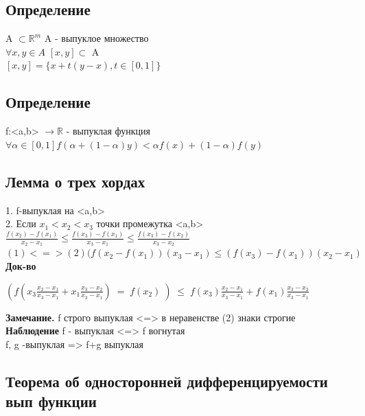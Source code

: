 \documentclass[12pt, a4paper]{article}
\begin{document}
	\subsection{Определение}
	A $\subset \mathbb{R}^m$ A - выпуклое множество \\
	$\forall x, y \in A$  $[x,y] \subset$ A \\
	$[x,y]=\lbrace x+t(y-x), t \in [0,1] \rbrace$ \\
	
	\subsection{Определение}
	f:<a,b> $\rightarrow \mathbb{R}$ - выпуклая функция \\
	$\forall \alpha \in [0,1] f (\alpha + (1-\alpha)y)< \alpha f(x) + (1-\alpha)f(y)$ \\
	
	\subsection{Лемма о трех хордах}
	1. f-выпуклая на <a,b> \\
	2. Если $x_{1} < x_{2} < x_{3}$  точки промежутка <a,b> \\
	$ \frac{f(x_2)-f(x_1)}{x_2-x_1}\leq\frac{\displaystyle f(x_3)-f(x_1)}{\displaystyle x_3-x_1}\leq\frac{\displaystyle f(x_3)-f(x_2)}{\displaystyle x_3-x_2}$ \\
	$(1) <=> (2) (f(x_2-f(x_1))(x_3 -x_1) \leq (f(x_3)-f(x_{1}))(x_{2}-x_{1})$ \\
	
	\textbf{Док-во}
	
	$(f(x_3\frac{x_2-x_1}{x_3-x_1}+x_1\frac{x_3-x_2}{x_3-x_1})\;=\;f(x_2)\;)\;\leq\;f(x_3)\frac{x_2-x_1}{x_3-x_1}+f(x_1)\frac{x_3-x_2}{x_3-x_1}$
	
	\textbf{Замечание.} 
	f строго выпуклая <=> в неравенстве (2) знаки строгие \\
	\textbf{Наблюдение} f - выпуклая <=> f вогнутая \\
	f, g -выпуклая => f+g выпуклая 
	
	\subsection{Теорема об односторонней дифференцируемости вып функции}
	
\end{document}
